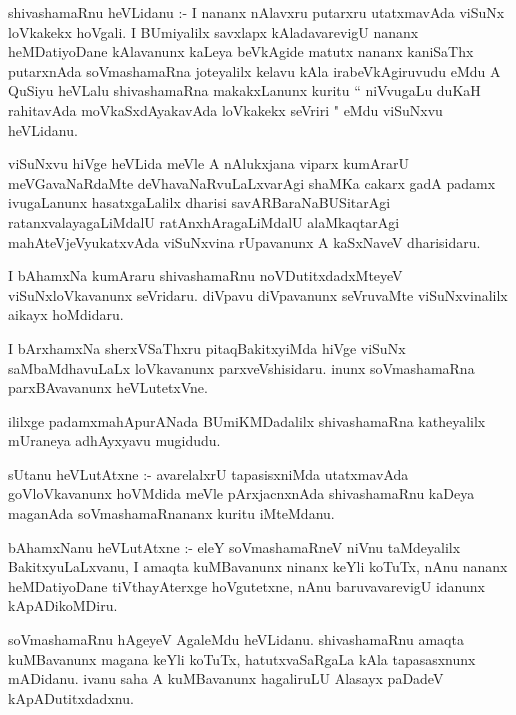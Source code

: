 \documentclass{article}
\begin{document}
\begin{mn}
shivashamaRnu heVLidanu :- I nananx nAlavxru putarxru utatxmavAda viSuNx 
loVkakekx hoVgali. I BUmiyalilx savxlapx kAladavarevigU nananx 
heMDatiyoDane kAlavanunx kaLeya beVkAgide matutx nananx kaniSaThx 
putarxnAda soVmashamaRna joteyalilx kelavu kAla irabeVkAgiruvudu eMdu  A QuSiyu
heVLalu  shivashamaRna  makakxLanunx kuritu  `` niVvugaLu duKaH rahitavAda
moVkaSxdAyakavAda loVkakekx seVriri " eMdu viSuNxvu heVLidanu.
\end{mn}

\begin{mn}
viSuNxvu hiVge heVLida meVle A nAlukxjana viparx kumArarU meVGavaNaRdaMte 
deVhavaNaRvuLaLxvarAgi shaMKa cakarx gadA padamx ivugaLanunx 
hasatxgaLalilx dharisi savARBaraNaBUSitarAgi ratanxvalayagaLiMdalU
ratAnxhAragaLiMdalU alaMkaqtarAgi mahAteVjeVyukatxvAda viSuNxvina rUpavanunx A 
kaSxNaveV dharisidaru.
\end{mn}

\begin{mn}
I bAhamxNa kumAraru shivashamaRnu noVDutitxdadxMteyeV viSuNxloVkavanunx 
seVridaru. diVpavu diVpavanunx seVruvaMte viSuNxvinalilx aikayx hoMdidaru.
\end{mn}

\begin{mn}
I bArxhamxNa sherxVSaThxru pitaqBakitxyiMda hiVge viSuNx saMbaMdhavuLaLx 
loVkavanunx parxveVshisidaru. inunx soVmashamaRna parxBAvavanunx heVLutetxVne.
\end{mn}

\begin{mn}
ililxge padamxmahApurANada BUmiKMDadalilx shivashamaRna katheyalilx
      mUraneya adhAyxyavu mugidudu.
\end{mn}

\begin{mn}
sUtanu heVLutAtxne :- avarelalxrU tapasisxniMda utatxmavAda goVloVkavanunx
hoVMdida meVle pArxjacnxnAda shivashamaRnu kaDeya maganAda soVmashamaRnananx
kuritu iMteMdanu.
\end{mn}

\begin{mn}
bAhamxNanu heVLutAtxne :- eleY soVmashamaRneV niVnu taMdeyalilx 
BakitxyuLaLxvanu, I amaqta kuMBavanunx ninanx keYli koTuTx, nAnu nananx 
heMDatiyoDane tiVthayAterxge  hoVgutetxne, nAnu baruvavarevigU idanunx 
kApADikoMDiru.
\end{mn}

\begin{mn}
soVmashamaRnu hAgeyeV AgaleMdu heVLidanu. shivashamaRnu amaqta kuMBavanunx
magana keYli koTuTx, hatutxvaSaRgaLa kAla tapasasxnunx mADidanu. ivanu 
saha A kuMBavanunx hagaliruLU Alasayx paDadeV kApADutitxdadxnu.
\end{mn} 
\end{document}
